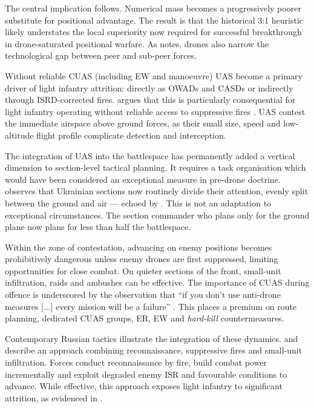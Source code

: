 The central implication follows. Numerical mass becomes a progressively poorer substitute for positional advantage. The result is that the historical 3:1 heuristic likely understates the local superiority now required for successful breakthrough in drone-saturated positional warfare. As \textcite[40:33--44:00]{WATLING_2023_book_launch} notes, drones also narrow the technological gap between peer and sub-peer forces.

Without reliable CUAS (including EW and manoeuvre) UAS become a primary driver of light infantry attrition: directly as OWADs and CASDs or indirectly through ISRD-corrected fires. \textcite[29]{MOLLOY_2024} argues that this is particularly consequential for light infantry operating without reliable access to suppressive fires \parencite[23]{kunertova_2024_2024_08}. UAS contest the immediate airspace above ground forces, as their small size, speed and low-altitude flight profile complicate detection and interception.

The integration of UAS into the battlespace has permanently added a vertical dimension to section-level tactical planning. It requires a task organisation which would have been considered an exceptional measure in pre-drone doctrine. \textcite[17]{watling_2025_10} observes that Ukrainian sections now routinely divide their attention, evenly split between the ground and air --- echoed by \textcite{Liber_Ukraine_1_2026_2_20}. This is not an adaptation to exceptional circumstances. The section commander who plans only for the ground plane now plans for less than half the battlespace.

Within the zone of contestation, advancing on enemy positions becomes prohibitively dangerous unless enemy drones are first suppressed, limiting opportunities for close combat. On quieter sections of the front, small-unit infiltration, raids and ambushes can be effective. The importance of CUAS during offence is underscored by the observation that ``if you don't use anti-drone measures [...] every mission will be a failure'' \parencite{uKR_LESSONS_LEARNED_2}. This places a premium on route planning, dedicated CUAS groups, ER, EW and \textit{hard-kill} countermeasures.


Contemporary Russian tactics illustrate the integration of these dynamics. \textcite[3--4]{watling_2025_10} and \textcite{Zabrodksyi_watling} describe an approach combining reconnaissance, suppressive fires and small-unit infiltration. Forces conduct reconnaissance by fire, build combat power incrementally and exploit degraded enemy ISR and favourable conditions to advance. While effective, this approach exposes light infantry to significant attrition, as evidenced in \textcite{ombr66_2026_03_20_all_arms_Defence}.

